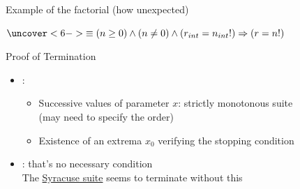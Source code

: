 \begin{frame}{Example of the factorial (how unexpected)}
\begin{itemize}
    $\uncover<6->{\equiv(n\geq 0)\wedge (n\neq 0)\wedge (r_{int}=n_{int}!) \Rightarrow (r=n!)}$

    \medskip
  \end{itemize}
\end{frame}

\begin{frame}{Proof of Termination}
  \begin{itemize}
  \item {}:
    \begin{itemize}
    \item Successive values of parameter $x$: \alert{strictly monotonous suite}\\ 
      (may need to specify the order)
    \item Existence of an \alert{extrema} $x_0$ \alert{verifying the
        stopping condition}
    \end{itemize}
  \item {}: that's no necessary condition\\
    The \hyperlink{syracuse}{Syracuse suite} seems to terminate without
    this\bigskip

  \end{itemize}
\end{frame}
